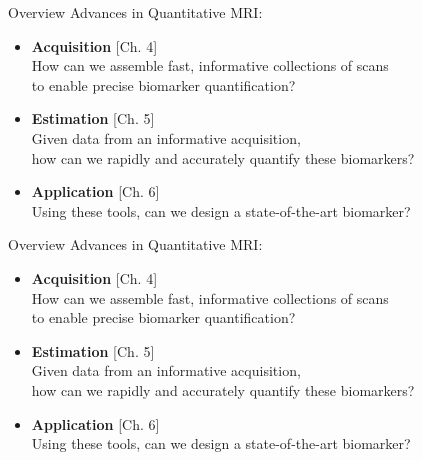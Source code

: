 \documentclass[draft]{beamer}
\begin{document}
\begin{frame}{Overview}
	Advances in Quantitative MRI: 
	\begin{itemize}
		\item<1>{
			\textbf{Acquisition} \hfill \textcolor{arch-ivy}{[Ch. 4]} \\
			How can we assemble fast, informative collections of scans \\
			to enable precise biomarker quantification? 
		}
		
		\item<0>{
			\textbf{Estimation} \hfill \textcolor{arch-ivy}{[Ch. 5]} \\
			Given data from an informative acquisition, \\
			how can we rapidly and accurately quantify these biomarkers?
		}
		\item<0>{
			\textbf{Application} \hfill \textcolor{arch-ivy}{[Ch. 6]} \\
			Using these tools,
			can we design a state-of-the-art biomarker?
		}
	\end{itemize}
\end{frame}



\begin{frame}{Overview}
	Advances in Quantitative MRI: 
	\begin{itemize}
		\item<0>{
			\textbf{Acquisition} \hfill \textcolor{arch-ivy}{[Ch. 4]} \\
			How can we assemble fast, informative collections of scans \\
			to enable precise biomarker quantification? 
		}
		\item<1>{
			\textbf{Estimation} \hfill \textcolor{arch-ivy}{[Ch. 5]} \\
			Given data from an informative acquisition, \\
			how can we rapidly and accurately quantify these biomarkers?
		}
		\item<0>{
			\textbf{Application} \hfill \textcolor{arch-ivy}{[Ch. 6]} \\
			Using these tools,
			can we design a state-of-the-art biomarker?
		}
	\end{itemize}
\end{frame}


\end{document}
